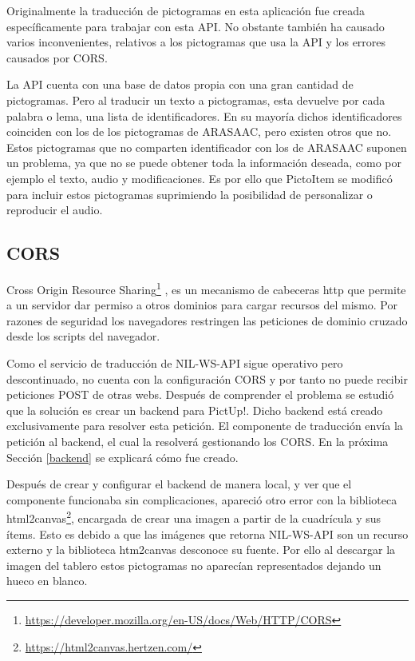 Originalmente la traducción de pictogramas en esta aplicación fue creada específicamente para trabajar con esta API. No obstante también ha causado varios inconvenientes, relativos a los pictogramas que usa la API y los errores causados por CORS. 

La API cuenta con una base de datos propia con una gran cantidad de pictogramas. Pero al traducir un texto a pictogramas, esta devuelve por cada palabra o lema, una lista de identificadores. En su mayoría dichos identificadores coinciden con los de los pictogramas de ARASAAC, pero existen otros que no. Estos pictogramas que no comparten identificador con los de ARASAAC suponen un problema, ya que no se puede obtener toda la información deseada, como por ejemplo el texto, audio y modificaciones. Es por ello que PictoItem se modificó para incluir estos pictogramas suprimiendo la posibilidad de personalizar o reproducir el audio.

\subsection{CORS}

Cross Origin Resource Sharing\footnote{\url{https://developer.mozilla.org/en-US/docs/Web/HTTP/CORS}}  , es un mecanismo de cabeceras http que permite a un servidor dar permiso a otros dominios para cargar recursos del mismo. Por razones de seguridad los navegadores restringen las peticiones de dominio cruzado desde los scripts del navegador. 


Como el servicio de traducción de NIL-WS-API sigue operativo pero descontinuado, no cuenta con la configuración CORS y por tanto no puede recibir peticiones POST de otras webs. Después de comprender el problema se estudió que la solución es crear un backend para PictUp!. Dicho backend está creado exclusivamente para resolver esta petición. El componente de traducción envía la petición al backend, el cual la resolverá gestionando los CORS. En la próxima Sección \ref{backend} se explicará cómo fue creado. 


Después de crear y configurar el backend de manera local, y ver que el componente funcionaba sin complicaciones, apareció otro error con la biblioteca html2canvas\footnote{\url{https://html2canvas.hertzen.com/}}, encargada de crear una imagen a partir de la cuadrícula y sus ítems. Esto es debido a que las imágenes que retorna NIL-WS-API son un recurso externo y la biblioteca htm2canvas desconoce su fuente. Por ello al descargar la imagen del tablero estos pictogramas no aparecían representados dejando un hueco en blanco.


